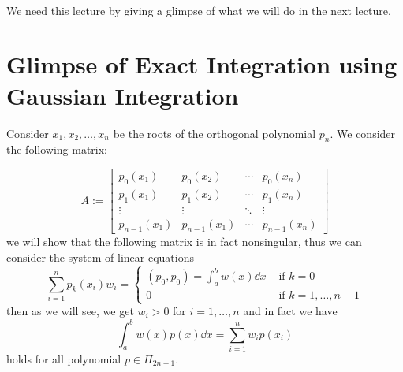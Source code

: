 \ 

We need this lecture by giving a glimpse of what we will do in the next lecture. 

\section{Glimpse of Exact Integration using Gaussian Integration}

Consider $x_1, x_2, \dots, x_n$ be the roots of the orthogonal polynomial $p_n$. We consider the following matrix: 

\begin{equation}\label{eq2:apr11B}
    A := \begin{bmatrix}
        p_0(x_1) & p_0(x_2) & \cdots & p_0(x_n) \\ 
        p_1(x_1) & p_1(x_2) & \cdots & p_1(x_n) \\ 
        \vdots & \vdots & \ddots & \vdots \\ 
        p_{n-1}(x_1) & p_{n-1}(x_1) & \cdots & p_{n-1}(x_n) 
    \end{bmatrix}
\end{equation}
we will show that the following matrix is in fact nonsingular, thus we can consider the system of linear equations 
\begin{equation}\label{eq3:apr11B}
    \sum_{i=1}^n p_k(x_i) w_i = \begin{cases}
        (p_0,p_0) = \int_a^b w(x) \dd{x} & \mbox{ if } k = 0 \\ 
        0 & \mbox{ if } k = 1, \dots, n-1
    \end{cases}
\end{equation}
then as we will see, we get $w_i > 0$ for $ i = 1,\dots,n$ and in fact we have 
\begin{equation}\label{eq4:apr11B}
    \int_a^b w(x)p(x) \dd{x} = \sum_{i=1}^n w_i p(x_i)
\end{equation}
holds for all polynomial $p \in \Pi_{2n-1}$.

